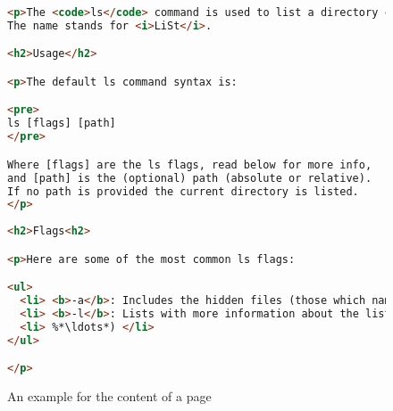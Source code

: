 \documentclass[hidelinks,12pt,a4paper,numbers=enddot]{scrartcl}
\begin{document}
\begin{figure}[h]
\begin{lstlisting}[language=html]
<p>The <code>ls</code> command is used to list a directory content or a file.<br>
The name stands for <i>LiSt</i>.

<h2>Usage</h2>

<p>The default ls command syntax is:

<pre>
ls [flags] [path]
</pre>

Where [flags] are the ls flags, read below for more info,
and [path] is the (optional) path (absolute or relative).
If no path is provided the current directory is listed.
</p>
 
<h2>Flags<h2>

<p>Here are some of the most common ls flags:

<ul>
  <li> <b>-a</b>: Includes the hidden files (those which name starts with ".") </li>
  <li> <b>-l</b>: Lists with more information about the list file(s) </li>
  <li> %*\ldots*) </li>
</ul>

</p>
\end{lstlisting}
\caption{An example for the content of a page}
\end{figure}
\end{document}
